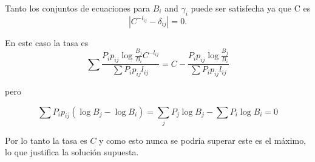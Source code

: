 Tanto los conjuntos de ecuaciones para $B_{i}$ and $\gamma_{i}$ puede ser satisfecha ya 
que C es
\begin{equation}
\left | C^{-l_{ij}} - \delta _{ij}\right |=0.
\end{equation}

En este caso la tasa es
\begin{equation}
\sum \frac{P_{i}p_{ij}\log \frac{B_{j}}{B_{i}}C^{-l_{ij}}}{\sum P_{i}p_{ij}l_{ij}}=C-\frac{P_{i}p_{ij}\log \frac{B_{j}}{B_{i}}}{\sum P_{i}p_{ij}l_{ij}}
\end{equation}

pero

\begin{equation}
\sum P_{i}p_{ij}(\log B_{j}-\log B_{i})=\sum_{j}P_{j}\log B_{j}-\sum P_{i}\log B_{i}=0
\end{equation}

Por lo tanto la tasa es $C$ y como esto nunca se podr\'ia superar este es el 
m\'aximo, lo que justifica la soluci\'on supuesta.









 

